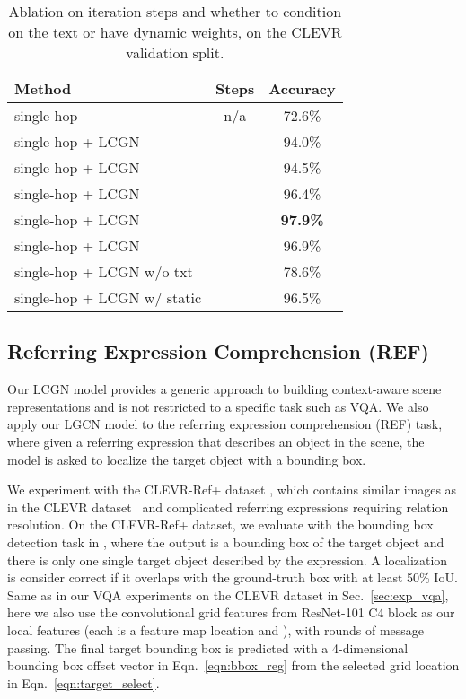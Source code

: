 \documentclass[10pt,twocolumn,letterpaper]{article}
\begin{document}
\begin{table}[t]
\small
\vspace{-1.5em}
\begin{center}
\begin{tabular}{lcc}
\toprule
Method & Steps  & Accuracy \\
\midrule
single-hop & n/a & 72.6\% \\
\midrule
single-hop + LCGN &  & 94.0\% \\
single-hop + LCGN &  & 94.5\% \\
single-hop + LCGN &  & 96.4\% \\
single-hop + LCGN &  & \textbf{97.9\%} \\
single-hop + LCGN &  & 96.9\% \\
\midrule
single-hop + LCGN w/o txt &  & 78.6\% \\
single-hop + LCGN w/ static  &  & 96.5\% \\
\bottomrule
\end{tabular}
\end{center}
\vspace{-0.7em}
\caption{Ablation on iteration steps  and whether to condition on the text or have dynamic weights, on the CLEVR validation split.}
\label{tab:clevr_step}
\vspace{-1.5em}
\end{table}

\subsection{Referring Expression Comprehension (REF)}
\label{sec:exp_ref}

Our LCGN model provides a generic approach to building context-aware scene representations and is not restricted to a specific task such as VQA. We also apply our LGCN model to the referring expression comprehension (REF) task, where given a referring expression that describes an object in the scene, the model is asked to localize the target object with a bounding box. 

We experiment with the CLEVR-Ref+ dataset \cite{liu2019clevr}, which contains similar images as in the CLEVR dataset~\cite{johnson2017clevr} and complicated referring expressions requiring relation resolution. On the CLEVR-Ref+ dataset, we evaluate with the bounding box detection task in \cite{liu2019clevr}, where the output is a bounding box of the target object and there is only one single target object described by the expression. A localization is consider correct if it overlaps with the ground-truth box with at least 50\% IoU. Same as in our VQA experiments on the CLEVR dataset in Sec.~\ref{sec:exp_vqa}, here we also use the  convolutional grid features from ResNet-101 C4 block as our local features  (\ie each  is a feature map location and ), with  rounds of message passing. The final target bounding box is predicted with a 4-dimensional bounding box offset vector  in Eqn.~\ref{eqn:bbox_reg} from the selected grid location  in Eqn.~\ref{eqn:target_select}.
\end{document}
